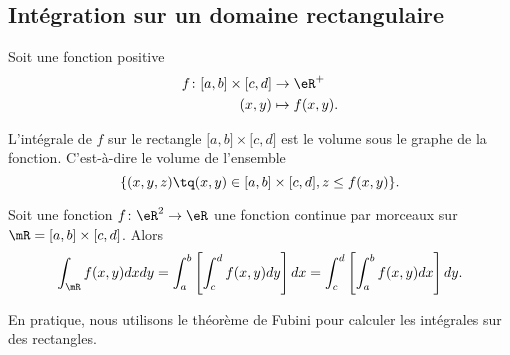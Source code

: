 \subsection{Intégration sur un domaine rectangulaire}
\label{PgRapIntMultFubiniRect}

Soit une fonction positive
\begin{equation}
    \begin{aligned}
        f\colon \mathopen[ a , b \mathclose]\times\mathopen[ c , d \mathclose]&\to \eR^+ \\
        (x,y)&\mapsto f(x,y).
    \end{aligned}
\end{equation}

L'intégrale de $f$ sur le rectangle $\mathopen[ a , b \mathclose]\times\mathopen[ c , d \mathclose]$ est le volume sous le graphe de la fonction. C'est-à-dire le volume de l'ensemble
\begin{equation}
    \{ (x,y,z)\tq (x,y)\in\mathopen[ a , b \mathclose]\times\mathopen[ c , d \mathclose], z\leq f(x,y) \}.
\end{equation}

\begin{theorem}
    Soit une fonction $f\colon \eR^2\to \eR$ une fonction continue par morceaux sur $\mR=\mathopen[ a , b \mathclose]\times\mathopen[ c , d \mathclose]$. Alors
    \begin{equation}
        \int_{\mR}f(x,y)dxdy=\int_a^b\left[ \int_c^df(x,y)dy \right]dx=\int_c^d\left[ \int_a^bf(x,y)dx \right]dy.
    \end{equation}
\end{theorem}

En pratique, nous utilisons le théorème de Fubini pour calculer les intégrales sur des rectangles.

